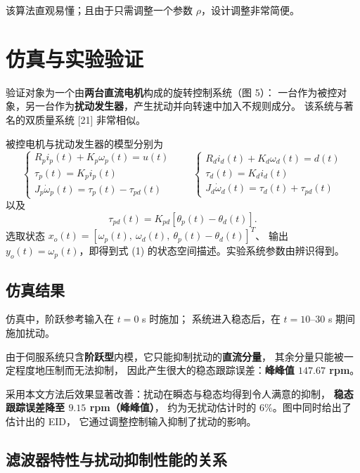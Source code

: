 \documentclass[11pt,a4paper]{ctexart}
\begin{document}
该算法直观易懂；且由于只需调整一个参数 $\rho$，设计调整非常简便。

\section{仿真与实验验证}

验证对象为一个由\textbf{两台直流电机}构成的旋转控制系统（图 5）：
一台作为被控对象，另一台作为\textbf{扰动发生器}，产生扰动并向转速中加入不规则成分。
该系统与著名的双质量系统 [21] 非常相似。

被控电机与扰动发生器的模型分别为
\begin{equation}
\begin{cases}
R_p i_p(t)+K_p\omega_p(t)=u(t)\\
\tau_p(t)=K_p i_p(t)\\
J_p\dot\omega_p(t)=\tau_p(t)-\tau_{pd}(t)
\end{cases}
\qquad
\begin{cases}
R_d i_d(t)+K_d\omega_d(t)=d(t)\\
\tau_d(t)=K_d i_d(t)\\
J_d\dot\omega_d(t)=\tau_d(t)+\tau_{pd}(t)
\end{cases}
\end{equation}
以及
\begin{equation}
\tau_{pd}(t)=K_{pd}\left[\theta_p(t)-\theta_d(t)\right].
\end{equation}
选取状态 $x_o(t)=\left[\omega_p(t),\ \omega_d(t),\ \theta_p(t)-\theta_d(t)\right]^{T}$、
输出 $y_o(t)=\omega_p(t)$，即得到式 (1) 的状态空间描述。实验系统参数由辨识得到。

\subsection{仿真结果}

仿真中，阶跃参考输入在 $t=0$ s 时施加；
系统进入稳态后，在 $t=10$--$30$ s 期间施加扰动。

由于伺服系统只含\textbf{阶跃型}内模，它只能抑制扰动的\textbf{直流分量}，
其余分量只能被一定程度地压制而无法抑制，
因此产生很大的稳态跟踪误差：\textbf{峰峰值 $147.67$ rpm}。

采用本文方法后效果显著改善：扰动在瞬态与稳态均得到令人满意的抑制，
\textbf{稳态跟踪误差降至 $9.15$ rpm（峰峰值）}，
约为无扰动估计时的 $6\%$。图中同时给出了估计出的 EID，
它通过调整控制输入抑制了扰动的影响。

\subsection{滤波器特性与扰动抑制性能的关系}
\end{document}
